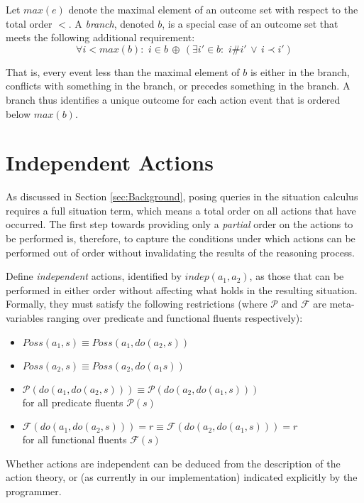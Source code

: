 Let $max(e)$ denote the maximal element of an outcome set with respect
to the total order $<$. A \emph{branch}, denoted $b$, is a special
case of an outcome set that meets the following additional requirement:\[
\forall i<max(b):\,\, i\in b\,\oplus\,(\exists i'\in b:\,\, i\#i'\,\vee\, i\prec i')\]


That is, every event less than the maximal element of $b$ is either
in the branch, conflicts with something in the branch, or precedes
something in the branch. A branch thus identifies a unique outcome
for each action event that is ordered below $max(b)$.


\section{Independent Actions\label{sec:JointExec:IndepActs}}

As discussed in Section \ref{sec:Background}, posing queries in the
situation calculus requires a full situation term, which means a total
order on all actions that have occurred. The first step towards providing
only a \emph{partial} order on the actions to be performed is, therefore,
to capture the conditions under which actions can be performed out
of order without invalidating the results of the reasoning process.

Define \emph{independent} actions, identified by $indep(a_{1},a_{2})$,
as those that can be performed in either order without affecting what
holds in the resulting situation. Formally, they must satisfy the
following restrictions (where $\mathcal{P}$ and $\mathcal{F}$ are
meta-variables ranging over predicate and functional fluents respectively):

\begin{itemize}
\item $Poss(a_{1},s)\equiv Poss(a_{1},do(a_{2},s))$ 
\item $Poss(a_{2},s)\equiv Poss(a_{2},do(a_{1}s))$ 
\item $\mathcal{P}(do(a_{1},do(a_{2},s)))\equiv\mathcal{P}(do(a_{2},do(a_{1},s)))$\\
 for all predicate fluents $\mathcal{P}(s)$ 
\item $\mathcal{F}(do(a_{1},do(a_{2},s)))=r\equiv\mathcal{F}(do(a_{2},do(a_{1},s)))=r$\\
 for all functional fluents $\mathcal{F}(s)$ 
\end{itemize}
Whether actions are independent can be deduced from the description
of the action theory, or (as currently in our implementation) indicated
explicitly by the programmer.

